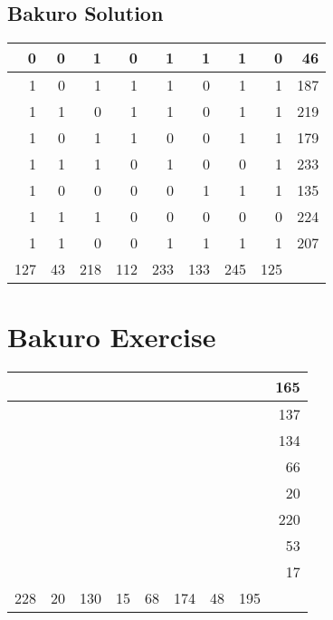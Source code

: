 \documentclass[]{article}
\begin{document}
 \subsection{Bakuro Solution} 
\begin{tabular}{rrrrrrrrr}
\hline
   0 &  0 &   1 &   0 &   1 &   1 &   1 &   0 &  46 \\ \hline
   1 &  0 &   1 &   1 &   1 &   0 &   1 &   1 & 187 \\ \hline
   1 &  1 &   0 &   1 &   1 &   0 &   1 &   1 & 219 \\ \hline
   1 &  0 &   1 &   1 &   0 &   0 &   1 &   1 & 179 \\ \hline
   1 &  1 &   1 &   0 &   1 &   0 &   0 &   1 & 233 \\ \hline
   1 &  0 &   0 &   0 &   0 &   1 &   1 &   1 & 135 \\ \hline
   1 &  1 &   1 &   0 &   0 &   0 &   0 &   0 & 224 \\ \hline
   1 &  1 &   0 &   0 &   1 &   1 &   1 &   1 & 207 \\ \hline
 127 & 43 & 218 & 112 & 233 & 133 & 245 & 125 &     \\ \hline
\hline
\end{tabular}\newpage\section{Bakuro Exercise}\begin{tabular}{rrrrrrrrr}
\hline
     &    &     &    &    &     &    &     & 165 \\ \hline
     &    &     &    &    &     &    &     & 137 \\ \hline
     &    &     &    &    &     &    &     & 134 \\ \hline
     &    &     &    &    &     &    &     &  66 \\ \hline
     &    &     &    &    &     &    &     &  20 \\ \hline
     &    &     &    &    &     &    &     & 220 \\ \hline
     &    &     &    &    &     &    &     &  53 \\ \hline
     &    &     &    &    &     &    &     &  17 \\ \hline
 228 & 20 & 130 & 15 & 68 & 174 & 48 & 195 &     \\ \hline
\hline
\end{tabular}\newpage 
\end{document}
